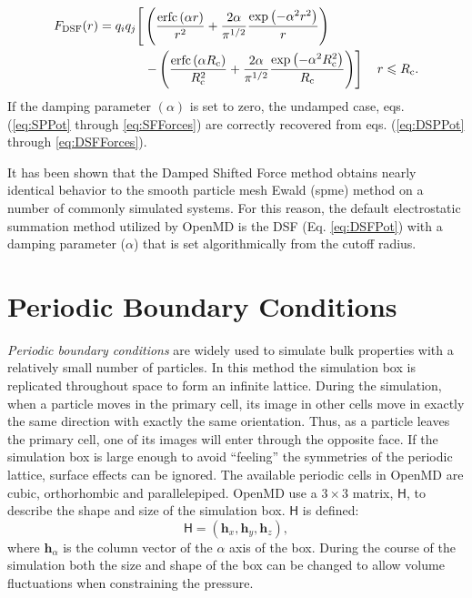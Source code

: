 \documentclass[]{book}
\begin{document}
\begin{equation}
\begin{split}
F_\mathrm{DSF}(r) =
q_iq_j\Biggr{[}&\left(\frac{\textrm{erfc}\left(\alpha r\right)}{r^2}+\frac{2\alpha}{\pi^{1/2}}\frac{\exp{\left(-\alpha^2r^2\right)}}{r}\right) \\ &\left.-\left(\frac{\textrm{erfc}\left(\alpha R_{\textrm{c}}\right)}{R_{\textrm{c}}^2}+\frac{2\alpha}{\pi^{1/2}}\frac{\exp{\left(-\alpha^2R_{\textrm{c}}^2
\right)}}{R_{\textrm{c}}}\right)\right] \quad r\leqslant R_\textrm{c}.
\label{eq:DSFForces}
\end{split}
\end{equation}
If the damping parameter $(\alpha)$ is set to zero, the undamped case,
eqs. (\ref{eq:SPPot} through \ref{eq:SFForces}) are correctly
recovered from eqs. (\ref{eq:DSPPot} through \ref{eq:DSFForces}).

It has been shown that the Damped Shifted Force method obtains nearly
identical behavior to the smooth particle mesh Ewald ({\sc spme})
method on a number of commonly simulated systems.\cite{Fennell06}  For
this reason, the default electrostatic summation method utilized by
{\sc OpenMD} is the DSF (Eq. \ref{eq:DSFPot}) with a damping parameter
($\alpha$) that is set algorithmically from the cutoff radius.

\section{\label{section:pbc}Periodic Boundary Conditions} 

\newcommand{\roundme}{\operatorname{round}}

\textit{Periodic boundary conditions} are widely used to simulate bulk
properties with a relatively small number of particles. In this method
the simulation box is replicated throughout space to form an infinite
lattice.  During the simulation, when a particle moves in the primary
cell, its image in other cells move in exactly the same direction with
exactly the same orientation. Thus, as a particle leaves the primary
cell, one of its images will enter through the opposite face. If the
simulation box is large enough to avoid ``feeling'' the symmetries of
the periodic lattice, surface effects can be ignored. The available
periodic cells in {\sc OpenMD} are cubic, orthorhombic and
parallelepiped.  {\sc OpenMD} use a $3 \times 3$ matrix, $\mathsf{H}$,
to describe the shape and size of the simulation box. $\mathsf{H}$ is
defined:
\begin{equation}
\mathsf{H} = ( \mathbf{h}_x, \mathbf{h}_y, \mathbf{h}_z ),
\end{equation}
where $\mathbf{h}_{\alpha}$ is the column vector of the $\alpha$ axis of the
box.  During the course of the simulation both the size and shape of
the box can be changed to allow volume fluctuations when constraining
the pressure.
\end{document}
